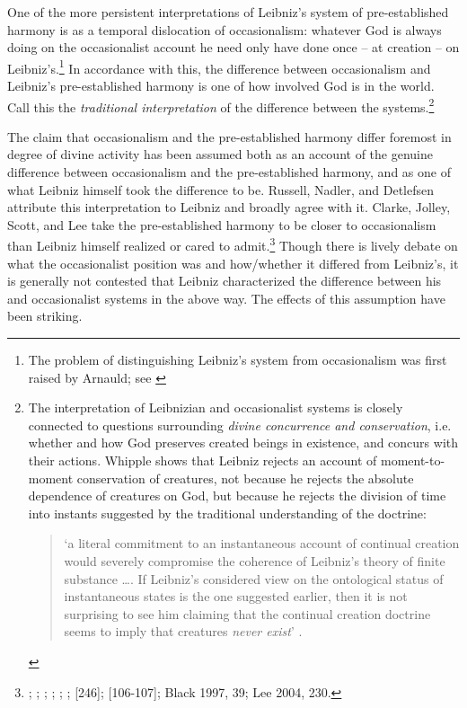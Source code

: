 \documentclass{article}
\begin{document}
One of the more persistent interpretations of Leibniz's system of
pre-established harmony is as a temporal dislocation of occasionalism:
whatever God is always doing on the occasionalist account he need only
have done once -- at creation -- on Leibniz's.\footnote{The problem of
  distinguishing Leibniz's system from occasionalism was first raised by
  Arnauld; see \autocite[vol. II, 84-90]{GP}} In accordance with this, the difference
between occasionalism and Leibniz's pre-established harmony is one of
how involved God is in the world. Call this the \emph{traditional
interpretation} of the difference between the systems.\footnote{The
  interpretation of Leibnizian and occasionalist systems is closely
  connected to questions surrounding \emph{divine concurrence and
  conservation}, i.e. whether and how God preserves created beings in
  existence, and concurs with their actions. Whipple shows that Leibniz rejects
  an account of moment-to-moment conservation of creatures, not because
  he rejects the absolute dependence of creatures on God, but because he
  rejects the division of time into instants suggested by the
  traditional understanding of the doctrine: 
  \begin{quote}
  	`a literal commitment to an
  	instantaneous account of continual creation would severely compromise
  	the coherence of Leibniz's theory of finite substance \ldots. If
  	Leibniz's considered view on the ontological status of instantaneous
  	states is the one suggested earlier, then it is not surprising to see
  	him claiming that the continual creation doctrine seems to imply that
  	creatures \emph{never exist}' \autocite[870]{Whipple2010}.
  \end{quote}}

The claim that occasionalism and the pre-established harmony differ
foremost in degree of divine activity has been assumed both as an
account of the genuine difference between occasionalism and the
pre-established harmony, and as one of what Leibniz himself took the
difference to be. Russell, Nadler, and Detlefsen attribute this
interpretation to Leibniz and broadly agree with it. Clarke, Jolley,
Scott, and Lee take the pre-established harmony to be closer to
occasionalism than Leibniz himself realized or cared to admit.\footnote{\autocite{Russell1951}; \autocite[31-32]{Nadler1993}; \autocite[449]{Detlefsen2003}; \autocite[121]{Clarke1989};
  \autocite{Clarke1995}; \autocite{Scott1997}; [246]\autocite{Jolley2002}; [106-107]\autocite{Jolley1990}; Black
  1997, 39; Lee 2004, 230.} Though there is lively debate on what the
occasionalist position was and how/whether it differed from Leibniz's,
it is generally not contested that Leibniz characterized the difference
between his and occasionalist systems in the above way. The effects of
this assumption have been striking.
\end{document}
